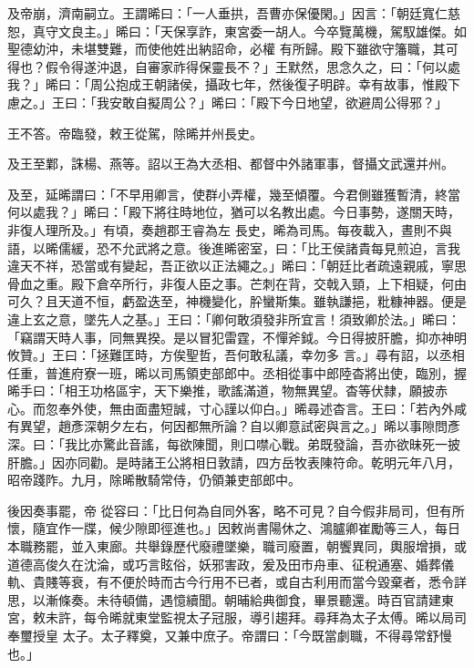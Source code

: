 \begin{pinyinscope}
 及帝崩，濟南嗣立。王謂晞曰：「一人垂拱，吾曹亦保優閑。」因言：「朝廷寬仁慈恕，真守文良主。」晞曰：「天保享詐，東宮委一胡人。今卒覽萬機，駕馭雄傑。如聖德幼沖，未堪雙難，而使他姓出納詔命，必權
 有所歸。殿下雖欲守籓職，其可得也？假令得遂沖退，自審家祚得保靈長不？」王默然，思念久之，曰：「何以處我？」晞曰：「周公抱成王朝諸侯，攝政七年，然後復子明辟。幸有故事，惟殿下慮之。」王曰：「我安敢自擬周公？」晞曰：「殿下今日地望，欲避周公得邪？」



 王不答。帝臨發，敕王從駕，除晞并州長史。



 及王至鄴，誅楊、燕等。詔以王為大丞相、都督中外諸軍事，督攝文武還并州。



 及至，延晞謂曰：「不早用卿言，使群小弄權，幾至傾覆。今君側雖獲暫清，終當何以處我？」晞曰：「殿下將往時地位，猶可以名教出處。今日事勢，遂關天時，非復人理所及。」有頃，奏趙郡王睿為左
 長史，晞為司馬。每夜載入，晝則不與語，以晞儒緩，恐不允武將之意。後進晞密室，曰：「比王侯諸貴每見煎迫，言我違天不祥，恐當或有變起，吾正欲以正法繩之。」晞曰：「朝廷比者疏遠親戚，寧思骨血之重。殿下倉卒所行，非復人臣之事。芒刺在背，交戟入頸，上下相疑，何由可久？且天道不恒，虧盈迭至，神機變化，肸蠻斯集。雖執謙挹，粃糠神器。便是違上玄之意，墜先人之基。」王曰：「卿何敢須發非所宜言！須致卿於法。」晞曰：「竊謂天時人事，同無異揆。是以冒犯雷霆，不憚斧鉞。今日得披肝膽，抑亦神明攸贊。」王曰：「拯難匡時，方俟聖哲，吾何敢私議，幸勿多
 言。」尋有詔，以丞相任重，普進府寮一班，晞以司馬領吏部郎中。丞相從事中郎陸杳將出使，臨別，握晞手曰：「相王功格區宇，天下樂推，歌謠滿道，物無異望。杳等伏隸，願披赤心。而忽奉外使，無由面盡短誠，寸心謹以仰白。」晞尋述杳言。王曰：「若內外咸有異望，趙彥深朝夕左右，何因都無所論？自以卿意試密與言之。」晞以事隙問彥深。曰：「我比亦驚此音謠，每欲陳聞，則口噤心戰。弟既發論，吾亦欲昧死一披肝膽。」因亦同勸。是時諸王公將相日敦請，四方岳牧表陳符命。乾明元年八月，昭帝踐阼。九月，除晞散騎常侍，仍領兼吏部郎中。



 後因奏事罷，帝
 從容曰：「比日何為自同外客，略不可見？自今假非局司，但有所懷，隨宜作一牒，候少隙即徑進也。」因敕尚書陽休之、鴻臚卿崔勵等三人，每日本職務罷，並入東廊。共舉錄歷代廢禮墜樂，職司廢置，朝饗異同，輿服增損，或道德高俊久在沈淪，或巧言眩俗，妖邪害政，爰及田市舟車、征稅通塞、婚葬儀軌、貴賤等衰，有不便於時而古今行用不已者，或自古利用而當今毀棄者，悉令詳思，以漸條奏。未待頓備，遇憶續聞。朝晡給典御食，畢景聽還。時百官請建東宮，敕未許，每令晞就東堂監視太子冠服，導引趨拜。尋拜為太子太傅。晞以局司奉璽授皇
 太子。太子釋奠，又兼中庶子。帝謂曰：「今既當劇職，不得尋常舒慢也。」




\end{pinyinscope}
